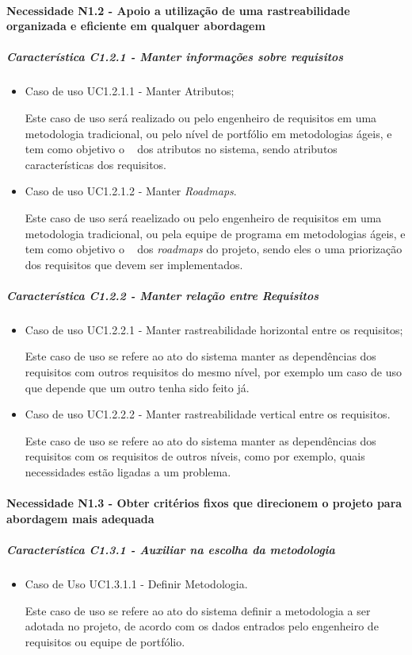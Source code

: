 \paragraph{Necessidade N1.2 - Apoio a utilização de uma rastreabilidade organizada e eficiente em qualquer abordagem}
	\subparagraph{Característica C1.2.1 - Manter informações sobre requisitos}
		\begin{itemize}
			
			\item Caso de uso UC1.2.1.1 - Manter Atributos;

				Este caso de uso será realizado ou pelo engenheiro de requisitos em uma metodologia tradicional, ou pelo nível de portfólio em metodologias ágeis, e tem como objetivo o \CRUD~ dos atributos no sistema, sendo atributos características dos requisitos.
			
			\item Caso de uso UC1.2.1.2 - Manter \textit{Roadmaps}.

				Este caso de uso será reaelizado ou pelo engenheiro de requisitos em uma metodologia tradicional, ou pela equipe de programa em metodologias ágeis, e tem como objetivo o \CRUD~ dos \textit{roadmaps} do projeto, sendo eles o uma priorização dos requisitos que devem ser implementados.

		\end{itemize}

	\subparagraph{Característica C1.2.2 - Manter relação entre Requisitos}
		\begin{itemize}
			
			\item Caso de uso UC1.2.2.1 - Manter rastreabilidade horizontal entre os requisitos;

				Este caso de uso se refere ao ato do sistema manter as dependências dos requisitos com outros requisitos do mesmo nível, por exemplo um caso de uso que depende que um outro tenha sido feito já.
			
			\item Caso de uso UC1.2.2.2 - Manter rastreabilidade vertical entre os requisitos.

				Este caso de uso se refere ao ato do sistema manter as dependências dos requisitos com os requisitos de outros níveis, como por exemplo, quais necessidades estão ligadas a um problema.
		\end{itemize}

\paragraph{Necessidade N1.3 - Obter critérios fixos que direcionem o projeto para abordagem mais adequada}
	\subparagraph{Característica C1.3.1 - Auxiliar na escolha da metodologia}
		\begin{itemize}
			
			\item Caso de Uso UC1.3.1.1 - Definir Metodologia.

				Este caso de uso se refere ao ato do sistema definir a metodologia a ser adotada no projeto, de acordo com os dados entrados pelo engenheiro de requisitos ou equipe de portfólio.
		\end{itemize}

